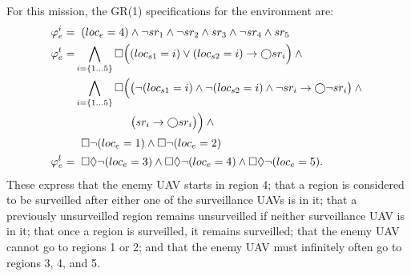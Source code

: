 \documentclass[runningheads]{llncs}
\begin{document}
For this mission, the GR(1) specifications for the environment are:
%
{\small
\begin{align}
\varphi_e^i  = & \;\; (loc_e = 4) \land \lnot sr_1 \land \lnot sr_2 \land sr_3 \land \lnot sr_4 \land sr_5  \label{eq:vipEnvInit} \\
\varphi_e^t  = & \bigwedge_{i = \{1 \ldots 5\}} \square \Big((loc_{s1} = i) \lor  (loc_{s2} = i) \rightarrow \varbigcirc sr_i \Big) \land \mbox{} \label{eq:srSet} \\
 & \bigwedge_{i = \{1 \ldots 5\}} \square \Big(\big(\lnot (loc_{s1} = i) \land  \lnot (loc_{s2} = i) \land \lnot sr_i \rightarrow \varbigcirc \lnot sr_i\big) \land \mbox{} \label{eq:vipEnvNoSp} \\
 & \quad\quad\quad\quad\quad \big(sr_i \rightarrow \varbigcirc sr_i\big)\Big) \land \mbox{} \label{eq:vipEnvSetSp} \\
 & \;\; \square \lnot (loc_e = 1) \land \square \lnot (loc_e = 2) \label{eq:vipEnvDisallowedRegions} \\
\varphi_e^l = & \;\; \square \lozenge \lnot (loc_e = 3) \land \square \lozenge \lnot (loc_e = 4) \land \square \lozenge \lnot (loc_e = 5). \label{eq:vipEnvLiveness}
\end{align}
}
\noindent These express  that the enemy UAV starts in region 4; 
 that a region is considered to be surveilled after either one of the surveillance UAVs is in it; 
 that a previously unsurveilled region remains unsurveilled if neither surveillance UAV is in it; 
 that once a region is surveilled, it remains surveilled; 
 that the enemy UAV cannot go to regions 1 or 2; and
 that the enemy UAV must infinitely often go to regions 3, 4, and 5. 
\end{document}
